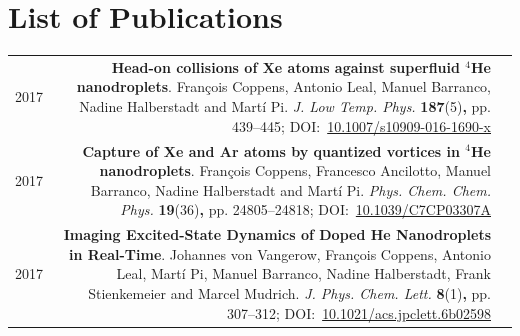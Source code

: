 \chapter{List of Publications}
	\hspace{-30pt}
	\begin{tabular}{l!{\VRule}Rc}
		2017 & \textbf{Head-on collisions of {Xe} atoms against superfluid $^4${H}e nanodroplets}. Fran\c{c}ois Coppens, Antonio Leal, Manuel Barranco, Nadine Halberstadt and Mart\'{i} Pi. \emph{J. Low Temp. Phys.} \textbf{187}(5)\textbf{,} pp. 439--445; DOI:~\href{https://doi.org/10.1007/s10909-016-1690-x}{10.1007/s10909-016-1690-x}&\vspace{20pt}\\
		2017 & \textbf{Capture of Xe and Ar atoms by quantized vortices in $^4$He nanodroplets}. Fran\c{c}ois Coppens, Francesco Ancilotto, Manuel Barranco, Nadine Halberstadt and Mart\'{i} Pi. \emph{Phys. Chem. Chem. Phys.} \textbf{19}(36)\textbf{,} pp. 24805--24818; DOI:~\href{http://dx.doi.org/10.1039/C7CP03307A}{10.1039/C7CP03307A}&\vspace{20pt}\\
		2017 & \textbf{Imaging Excited-State Dynamics of Doped He Nanodroplets in Real-Time}. Johannes von Vangerow, Fran\c{c}ois Coppens, Antonio Leal, Mart\'{i} Pi, Manuel Barranco, Nadine Halberstadt, Frank Stienkemeier and Marcel Mudrich. \emph{J. Phys. Chem. Lett.} \textbf{8}(1)\textbf{,} pp. 307--312; DOI:~\href{http://dx.doi.org/10.1021/acs.jpclett.6b02598}{10.1021/acs.jpclett.6b02598}&\vspace{20pt}\\

\end{tabular}

